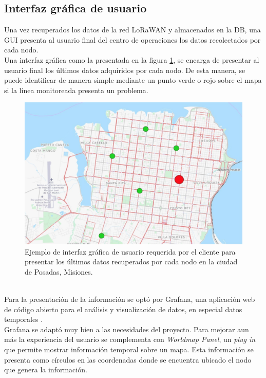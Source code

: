 \subsection{Interfaz gráfica de usuario}
Una vez recuperados los datos de la red LoRaWAN y almacenados en la DB, una GUI presenta al usuario final del centro de operaciones los datos recolectados por cada nodo.\\
Una interfaz gráfica como la presentada en la figura \ref{fig:guirequeridaporelcliente}, se encarga de presentar al usuario final los últimos datos adquiridos por cada nodo. De esta manera, se puede identificar de manera simple mediante un punto verde o rojo sobre el mapa si la línea monitoreada presenta un problema.
\begin{figure}[h!]
	\centering
	\includegraphics[width=0.7\linewidth]{Figures/GUI_requerida_por_el_cliente}
	\caption{Ejemplo de interfaz gráfica de usuario requerida por el cliente para presentar los últimos datos recuperados por cada nodo en la ciudad de Posadas, Misiones.}
	\label{fig:guirequeridaporelcliente}
\end{figure}\\
Para la presentación de la información se optó por Grafana, una aplicación web de código abierto para el análisis y visualización de datos, en especial datos temporales \citep{grafana}.\\
Grafana se adaptó muy bien a las necesidades del proyecto. Para mejorar aun más la experiencia del usuario se complementa con \textit{Worldmap Panel}, un \textit{plug in} que permite mostrar información temporal sobre un mapa. Esta información se presenta como círculos en las coordenadas donde se encuentra ubicado el nodo que genera la información.\\
